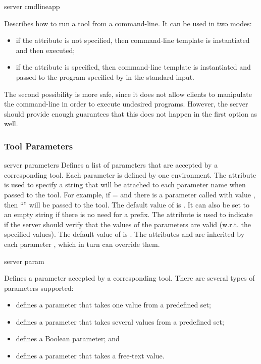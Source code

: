 \noindent
\xmlstruct
{server}
{cmdlineapp}
{%
%
  Describes how to run a tool from a command-line. It can be used in
  two modes:
%
\begin{itemize}

\item if the attribute  is not specified, then
  command-line template  is
  instantiated and then executed;

\item if the attribute  is specified, then
  command-line template  is
  instantiated and passed to the program specified by
   in the standard input.
\end{itemize}
%
The second possibility is more safe, since it does not allow clients
to manipulate the command-line in order to execute undesired
programs. However, the server should provide enough guarantees that
this does not happen in the first option as well.
%
}


\subsubsection{Tool Parameters}

\bigskip 
\xmlstruct
{server}
{parameters} 
{%
%
  Defines a list of parameters that are accepted by a corresponding
  tool. Each parameter is defined by one 
  environment.
  The  attribute is used to specify a string
  that will be attached to each parameter name when passed to the
  tool.
  For example, if = and
  there is a parameter called  with value , then
  ``'' will be passed to the tool.  The default value
  of  is . It can also be
  set to an empty string if there is no need for a prefix.
  The  attribute is used to indicate if the
  server should verify that the values of the parameters are valid
  (w.r.t. the specified values). The default value of
   is .
  The attributes  and  are
  inherited by each parameter , which in
  turn can override them.
%
}
{}%

\bigskip
\xmlstruct
{server}
{param}
{%
%
  Defines a parameter accepted by a corresponding tool. There
  are several types of parameters supported:
\begin{itemize}
\item {} defines a parameter that takes one
  value from a predefined set;
\item {} defines a parameter that takes several
  values from a predefined set;
\item {} defines a Boolean parameter; and
\item {} defines a parameter that takes a
  free-text value.
\end{itemize}
%
}


